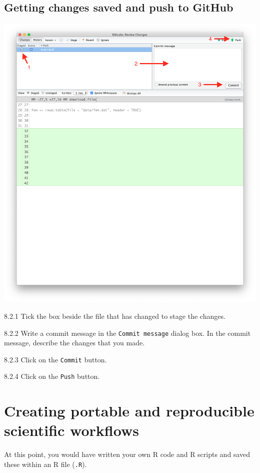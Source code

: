 \documentclass[
  12pt,
]{book}
\begin{document}
\hypertarget{getting-changes-saved-and-push-to-github}{%
\section{Getting changes saved and push to GitHub}\label{getting-changes-saved-and-push-to-github}}

\includegraphics{images/commit_push_pull2.png}

8.2.1 Tick the box beside the file that has changed to stage the changes.

8.2.2 Write a commit message in the \texttt{Commit\ message} dialog box. In the commit message, describe the changes that you made.

8.2.3 Click on the \texttt{Commit} button.

8.2.4 Click on the \texttt{Push} button.

\hypertarget{portable-reproducible}{%
\chapter{Creating portable and reproducible scientific workflows}\label{portable-reproducible}}

At this point, you would have written your own R code and R scripts and saved these within an R file (\texttt{.R}).
\end{document}
